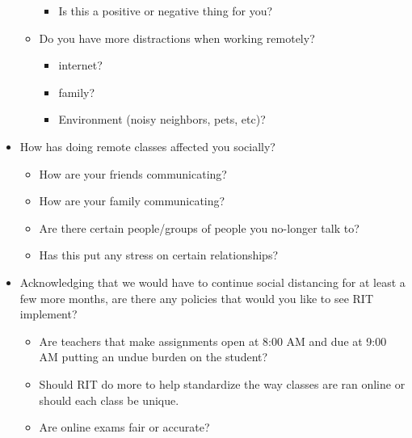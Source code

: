 \documentclass[12pt,
 reprint,
nofootinbib,
 amsmath,amssymb,
 aps,
floatfix,
]{revtex4-2}
\begin{document}
\begin{itemize}
\begin{itemize}
\begin{itemize}
                \item Is this a positive or negative thing for you?
            \end{itemize}
        \item Do you have more distractions when working remotely?
        \begin{itemize}
            \item internet?
            \item family?
            \item Environment (noisy neighbors, pets, etc)?
        \end{itemize}
    \end{itemize}
    \item How has doing remote classes affected you socially?
    \begin{itemize}
        \item How are your friends communicating?
        \item How are your family communicating?
        \item Are there certain people/groups of people you no-longer talk to?
        \item Has this put any stress on certain relationships?
    \end{itemize}
    \item Acknowledging that we would have to continue social distancing for at least a few more months, are there any policies that would you like to see RIT implement?
    \begin{itemize}
        \item Are teachers that make assignments open at 8:00 AM and due at 9:00 AM putting an undue burden on the student?
        \item Should RIT do more to help standardize the way classes are ran online or should each class be unique.
        \item Are online exams fair or accurate?
    \end{itemize}
\end{itemize}


\newpage



\end{document}
